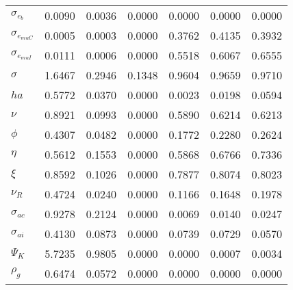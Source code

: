 \begin{center}
\begin{longtable}{lcccccc}
$ \sigma_{{e_b}}       $	 & 	          0.0090	 & 	          0.0036	 & 	          0.0000	 & 	          0.0000	 & 	          0.0000	 & 	          0.0000 \\ 
$ \sigma_{{e_{muC}}}   $	 & 	          0.0005	 & 	          0.0003	 & 	          0.0000	 & 	          0.3762	 & 	          0.4135	 & 	          0.3932 \\ 
$ \sigma_{{e_{muI}}}   $	 & 	          0.0111	 & 	          0.0006	 & 	          0.0000	 & 	          0.5518	 & 	          0.6067	 & 	          0.6555 \\ 
$ {\sigma}             $	 & 	          1.6467	 & 	          0.2946	 & 	          0.1348	 & 	          0.9604	 & 	          0.9659	 & 	          0.9710 \\ 
$ {ha}                 $	 & 	          0.5772	 & 	          0.0370	 & 	          0.0000	 & 	          0.0023	 & 	          0.0198	 & 	          0.0594 \\ 
$ \nu                  $	 & 	          0.8921	 & 	          0.0993	 & 	          0.0000	 & 	          0.5890	 & 	          0.6214	 & 	          0.6213 \\ 
$ {\phi}               $	 & 	          0.4307	 & 	          0.0482	 & 	          0.0000	 & 	          0.1772	 & 	          0.2280	 & 	          0.2624 \\ 
$ {\eta}               $	 & 	          0.5612	 & 	          0.1553	 & 	          0.0000	 & 	          0.5868	 & 	          0.6766	 & 	          0.7336 \\ 
$ \xi                  $	 & 	          0.8592	 & 	          0.1026	 & 	          0.0000	 & 	          0.7877	 & 	          0.8074	 & 	          0.8023 \\ 
$ {\nu_R}              $	 & 	          0.4724	 & 	          0.0240	 & 	          0.0000	 & 	          0.1166	 & 	          0.1648	 & 	          0.1978 \\ 
$ {\sigma_{ac}}        $	 & 	          0.9278	 & 	          0.2124	 & 	          0.0000	 & 	          0.0069	 & 	          0.0140	 & 	          0.0247 \\ 
$ {\sigma_{ai}}        $	 & 	          0.4130	 & 	          0.0873	 & 	          0.0000	 & 	          0.0739	 & 	          0.0729	 & 	          0.0570 \\ 
$ {\Psi_{K}}           $	 & 	          5.7235	 & 	          0.9805	 & 	          0.0000	 & 	          0.0000	 & 	          0.0007	 & 	          0.0034 \\ 
$ {\rho_g}             $	 & 	          0.6474	 & 	          0.0572	 & 	          0.0000	 & 	          0.0000	 & 	          0.0000	 & 	          0.0000 \\ 

\end{longtable}
\end{center}
